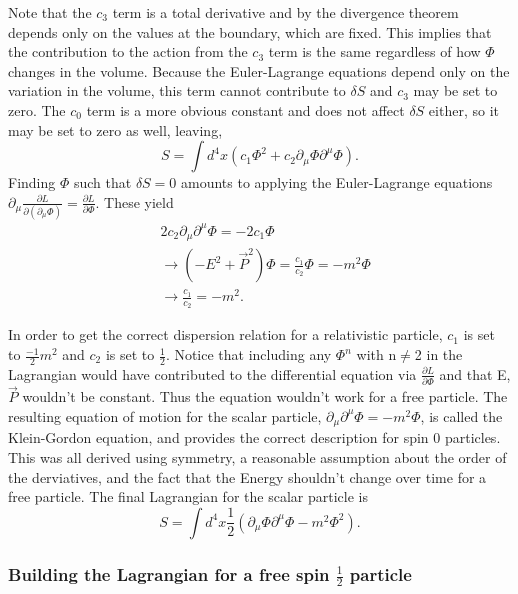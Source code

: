 \documentclass[12pt]{article}
\begin{document}
Note that the $c_3$ term is a total derivative and by the divergence theorem depends only on the values at the boundary, which are fixed. This implies that the contribution to the action from the $c_3$ term is the same regardless of how $\Phi$ changes in the volume. Because the Euler-Lagrange equations depend only on the variation in the volume, this term cannot contribute to $\delta S$ and $c_3$ may be set to zero. The $c_0$ term is a more obvious constant and does not affect $\delta S$ either, so it may be set to zero as well, leaving,  
\begin{equation}
S = \int d^4x \left(c_1 \Phi^2 + c_2 \partial_\mu\Phi\partial^\mu\Phi\right).
\end{equation}
Finding $\Phi$ such that $\delta S = 0$ amounts to applying the Euler-Lagrange equations $\partial_\mu \frac{\partial L}{\partial\left(\partial_\mu\Phi\right)} = \frac{\partial L}{\partial \Phi}$. These yield 
\begin{equation}
\begin{split}
&2c_2\partial_\mu\partial^\mu\Phi = -2c_1\Phi \\ 
&\rightarrow (-E^2 + \vec{P}^2)\Phi = \frac{c_1}{c_2}\Phi = -m^2\Phi \\
&\rightarrow \frac{c_1}{c_2} = -m^2.
\end{split}
\end{equation}

In order to get the correct dispersion relation for a relativistic particle, $c_1$ is set to $\frac{-1}{2}m^2$ and $c_2$ is set to $\frac{1}{2}$. Notice that including any $\Phi^n$ with n$\neq$2 in the Lagrangian would have contributed to the differential equation via $\frac{\partial L}{\partial \Phi}$ and that E, $\vec{P}$ wouldn't be constant. Thus the equation wouldn't work for a free particle. The resulting equation of motion for the scalar particle, $\partial_\mu\partial^\mu\Phi = -m^2\Phi$, is called the Klein-Gordon equation, and provides the correct description for spin 0 particles. This was all derived using symmetry, a reasonable assumption about the order of the derviatives, and the fact that the Energy shouldn't change over time for a free particle. The final Lagrangian for the scalar particle is 
\begin{equation}
S = \int d^4x \frac{1}{2}\left(\partial_\mu\Phi\partial^\mu\Phi - m^2 \Phi^2 \right).
\end{equation}

\subsubsection{Building the Lagrangian for a free spin $\frac{1}{2}$ particle}
\end{document}
